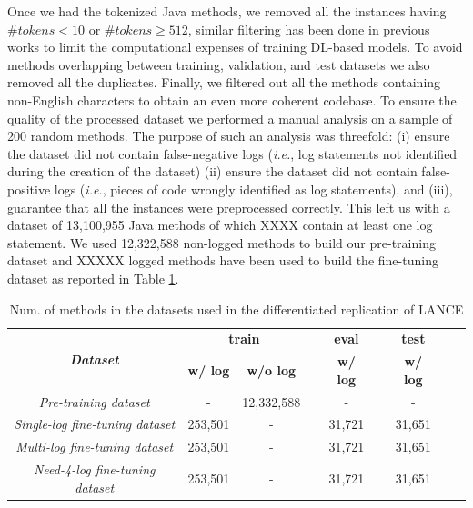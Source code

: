 Once we had the tokenized Java methods, we removed all the instances having $\#tokens < 10$ or $\#tokens \geq 512$, similar filtering has been done in previous works \cite{mastropaolo2021empirical,tufano2021automating,tufano2022using,ciniselli2021empirical, Tufano:tosem2019} to limit the computational expenses of training DL-based models.
To avoid methods overlapping between training, validation, and test datasets we also removed all the duplicates. 
Finally, we filtered out all the methods containing non-English characters to obtain an even more coherent codebase. 
To ensure the quality of the processed dataset we performed a manual analysis on a sample of 200 random methods. 
The purpose of such an analysis was threefold: (i) ensure  the dataset did not contain false-negative logs (\emph{i.e.}, log statements not identified during the creation of the dataset) (ii) ensure the dataset did not contain false-positive logs (\emph{i.e.}, pieces of code wrongly identified as log statements), and (iii), guarantee that all the instances were preprocessed correctly.
This left us with a dataset of 13,100,955 Java methods of which XXXX contain at least one log statement. We used 12,322,588 non-logged \java methods to build our pre-training dataset and XXXXX logged \java methods have been used to build the fine-tuning dataset as reported in Table \ref{tab:ds-summary-1}. 

\begin{table}[h]
	\centering
	\caption{Num. of methods in the datasets used in the differentiated replication of LANCE}
		\label{tab:ds-summary-1}
	\begin{tabular}{ccccccccc}
		\hline
		\multirow{2}{*}{\textit{\textbf{Dataset}}} & \multicolumn{2}{c}{\textbf{train}} & \textbf{} & \textbf{eval} & \textbf{} & \textbf{test}  \\ \cline{2-3} \cline{5-5} \cline{7-7} 
		& \textbf{w/ log} & \textbf{w/o log} & \textbf{} & \textbf{w/ log} & \textbf{} & \textbf{w/ log} \\ \hline
		\textit{Pre-training dataset}              & -               &      12,332,588  &           & -               &           &  -               \\
		\textit{Single-log fine-tuning dataset}               & 253,501         & -                &           & 31,721          &           & 31,651          \\
		\textit{Multi-log fine-tuning dataset}               & 253,501         & -                &           & 31,721          &           & 31,651          \\ 
		\textit{Need-4-log fine-tuning dataset}               & 253,501         & -                &           & 31,721          &           & 31,651          \\ \hline
	\end{tabular}
\end{table}



